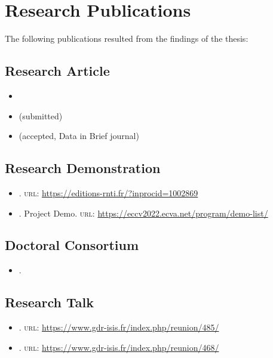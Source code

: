 \section{Research Publications}
The following publications resulted from the findings of the thesis:

\subsection*{Research Article}
\begin{itemize}
	\item {}
	\item {} (submitted)
	\item {} (accepted, Data in Brief journal)
\end{itemize}

\subsection*{Research Demonstration}
\begin{itemize}
	\item {}.  \textsc{url}: \url{https://editions-rnti.fr/?inprocid=1002869}
	\item {}. Project Demo. \textsc{url}: \url{https://eccv2022.ecva.net/program/demo-list/}
\end{itemize}

\subsection*{Doctoral Consortium}
\begin{itemize}
	\item {}.
\end{itemize}

\subsection*{Research Talk}
\begin{itemize}
	\item {}.  \textsc{url}: \url{https://www.gdr-isis.fr/index.php/reunion/485/}
	
	\item {}.  \textsc{url}: \url{https://www.gdr-isis.fr/index.php/reunion/468/}
\end{itemize}
